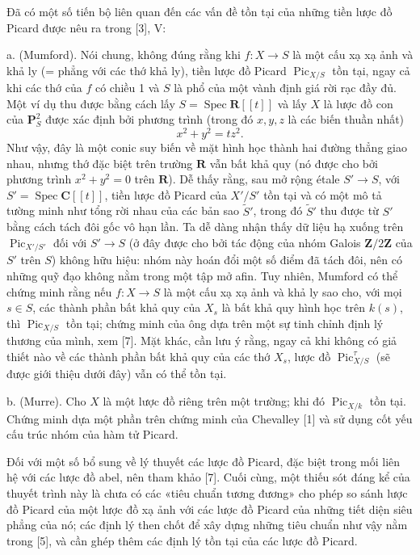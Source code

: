 \documentclass[11pt,twoside,openany]{book}
\numberwithin{equation}{section}
\newcommand{\src}[1]{%
  \phantomsection\hypertarget{src:\fgasourceid:#1}{}%
  \marginpar{\raggedleft\footnotesize\sffamily #1}%
}
\newcommand{\fgasourceid}{unset}
\begin{document}
Đã có một số tiến bộ liên quan đến các vấn đề tồn tại của những tiền lược đồ
Picard được nêu ra trong [3], V:

\medskip
\noindent a. (Mumford). Nói chung, không đúng rằng khi
$f:X\longrightarrow S$ là một cấu xạ xạ ảnh và khả ly (= phẳng với các thớ
khả ly), tiền lược đồ Picard $\operatorname{Pic}_{X/S}$ tồn tại, ngay cả khi
các thớ của $f$ có chiều 1 và $S$ là phổ của một vành định giá rời rạc đầy đủ.
Một ví dụ thu được bằng cách lấy $S=\operatorname{Spec}\mathbf R[[t]]$ và lấy
$X$ là lược đồ con của $\mathbf P^2_S$ được xác định bởi phương trình (trong đó
$x,y,z$ là các biến thuần nhất)
\[
x^2+y^2=tz^2.
\]
Như vậy, đây là một conic suy biến về mặt hình học thành hai đường thẳng giao
nhau, nhưng thớ đặc biệt trên trường $\mathbf R$ vẫn bất khả quy (nó được cho
bởi phương trình $x^2+y^2=0$ trên $\mathbf R$). Dễ thấy rằng, sau mở rộng étale
$S'\longrightarrow S$, với $S'=\operatorname{Spec}\mathbf C[[t]]$, tiền lược
đồ Picard của $X'/S'$ tồn tại và có một mô tả tường minh như tổng rời nhau của
các bản sao $\widetilde S'$, trong đó $\widetilde S'$ thu được từ $S'$ bằng
cách tách đôi gốc vô hạn lần. Ta dễ dàng nhận thấy dữ liệu hạ xuống trên
$\operatorname{Pic}_{X'/S'}$ đối với $S'\longrightarrow S$ (ở đây được cho
bởi tác động của nhóm Galois $\mathbf Z/2\mathbf Z$ của $S'$ trên $S$) không
hữu hiệu: nhóm này hoán đổi một số điểm đã tách đôi, nên có những quỹ đạo không
nằm trong một tập mở afin. Tuy nhiên, Mumford có thể chứng minh rằng nếu
$f:X\longrightarrow S$ là một cấu xạ xạ ảnh và khả ly sao cho, với mọi
$s\in S$, các thành phần bất khả quy của $X_s$ là bất khả quy hình học trên
$k(s)$, thì $\operatorname{Pic}_{X/S}$ tồn tại; chứng minh của ông dựa trên
một sự tinh chỉnh định lý thương của mình, xem [7]. Mặt khác, cần lưu ý rằng,
ngay cả khi không có giả thiết nào về các thành phần bất khả quy của các thớ
$X_s$, lược đồ $\operatorname{Pic}^{\tau}_{X/S}$ (sẽ được giới thiệu dưới
đây) vẫn có thể tồn tại.
\src{222}
\noindent b. (Murre). Cho $X$ là một lược đồ riêng trên một trường; khi đó
$\operatorname{Pic}_{X/k}$ tồn tại. Chứng minh dựa một phần trên chứng minh
của Chevalley [1] và sử dụng cốt yếu cấu trúc nhóm của hàm tử Picard.

Đối với một số bổ sung về lý thuyết các lược đồ Picard, đặc biệt trong mối
liên hệ với các lược đồ abel, nên tham khảo [7]. Cuối cùng, một thiếu sót đáng
kể của thuyết trình này là chưa có các «tiêu chuẩn tương đương» cho phép so
sánh lược đồ Picard của một lược đồ xạ ảnh với các lược đồ Picard của những
tiết diện siêu phẳng của nó; các định lý then chốt để xây dựng những tiêu
chuẩn như vậy nằm trong [5], và cần ghép thêm các định lý tồn tại của các
lược đồ Picard.
\end{document}
